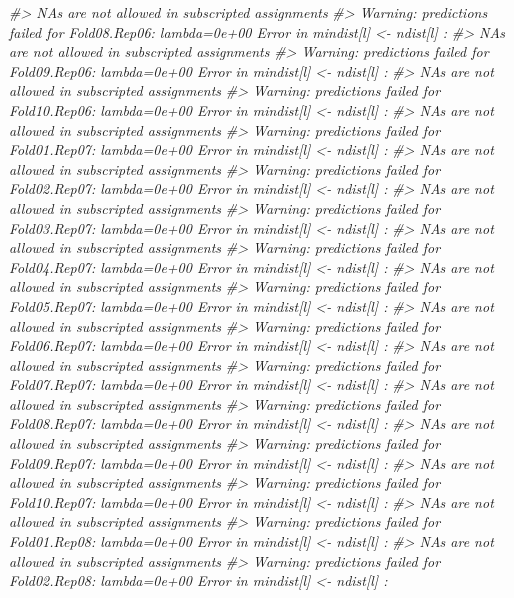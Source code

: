 \documentclass[]{book}
\newenvironment{Shaded}{\begin{snugshade}}{\end{snugshade}}
\newcommand{\CommentTok}[1]{\textcolor[rgb]{0.56,0.35,0.01}{\textit{#1}}}
\begin{document}
\begin{Shaded}
\begin{Highlighting}[]
\CommentTok{#>   NAs are not allowed in subscripted assignments}
\CommentTok{#> Warning: predictions failed for Fold08.Rep06: lambda=0e+00 Error in mindist[l] <- ndist[l] : }
\CommentTok{#>   NAs are not allowed in subscripted assignments}
\CommentTok{#> Warning: predictions failed for Fold09.Rep06: lambda=0e+00 Error in mindist[l] <- ndist[l] : }
\CommentTok{#>   NAs are not allowed in subscripted assignments}
\CommentTok{#> Warning: predictions failed for Fold10.Rep06: lambda=0e+00 Error in mindist[l] <- ndist[l] : }
\CommentTok{#>   NAs are not allowed in subscripted assignments}
\CommentTok{#> Warning: predictions failed for Fold01.Rep07: lambda=0e+00 Error in mindist[l] <- ndist[l] : }
\CommentTok{#>   NAs are not allowed in subscripted assignments}
\CommentTok{#> Warning: predictions failed for Fold02.Rep07: lambda=0e+00 Error in mindist[l] <- ndist[l] : }
\CommentTok{#>   NAs are not allowed in subscripted assignments}
\CommentTok{#> Warning: predictions failed for Fold03.Rep07: lambda=0e+00 Error in mindist[l] <- ndist[l] : }
\CommentTok{#>   NAs are not allowed in subscripted assignments}
\CommentTok{#> Warning: predictions failed for Fold04.Rep07: lambda=0e+00 Error in mindist[l] <- ndist[l] : }
\CommentTok{#>   NAs are not allowed in subscripted assignments}
\CommentTok{#> Warning: predictions failed for Fold05.Rep07: lambda=0e+00 Error in mindist[l] <- ndist[l] : }
\CommentTok{#>   NAs are not allowed in subscripted assignments}
\CommentTok{#> Warning: predictions failed for Fold06.Rep07: lambda=0e+00 Error in mindist[l] <- ndist[l] : }
\CommentTok{#>   NAs are not allowed in subscripted assignments}
\CommentTok{#> Warning: predictions failed for Fold07.Rep07: lambda=0e+00 Error in mindist[l] <- ndist[l] : }
\CommentTok{#>   NAs are not allowed in subscripted assignments}
\CommentTok{#> Warning: predictions failed for Fold08.Rep07: lambda=0e+00 Error in mindist[l] <- ndist[l] : }
\CommentTok{#>   NAs are not allowed in subscripted assignments}
\CommentTok{#> Warning: predictions failed for Fold09.Rep07: lambda=0e+00 Error in mindist[l] <- ndist[l] : }
\CommentTok{#>   NAs are not allowed in subscripted assignments}
\CommentTok{#> Warning: predictions failed for Fold10.Rep07: lambda=0e+00 Error in mindist[l] <- ndist[l] : }
\CommentTok{#>   NAs are not allowed in subscripted assignments}
\CommentTok{#> Warning: predictions failed for Fold01.Rep08: lambda=0e+00 Error in mindist[l] <- ndist[l] : }
\CommentTok{#>   NAs are not allowed in subscripted assignments}
\CommentTok{#> Warning: predictions failed for Fold02.Rep08: lambda=0e+00 Error in mindist[l] <- ndist[l] : }

\end{Highlighting}
\end{Shaded}
\end{document}
